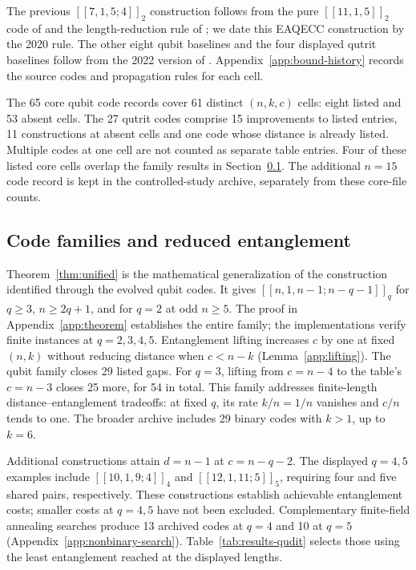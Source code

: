 \documentclass{article}
\begin{document}
The previous $[[7,1,5;4]]_2$ construction follows from the pure
$[[11,1,5]]_2$ code of \citet{CRSS1997} and the length-reduction rule of
\citet{GHW2020}; we date this EAQECC construction by the 2020 rule.
The other eight qubit baselines and the four displayed qutrit baselines
follow from the 2022 version of \citet{Luo2022}. Appendix~\ref{app:bound-history}
records the source codes and propagation rules for each cell.

The 65 core qubit code records cover 61 distinct $(n,k,c)$ cells: eight listed
and 53 absent cells. The 27 qutrit codes comprise 15 improvements
to listed entries, 11 constructions at absent cells and one code whose
distance is already listed. Multiple codes at one cell are not
counted as separate table entries. Four of these listed core cells overlap the
family results in Section~\ref{sec:family-results}. The additional
$n=15$ code record is kept in the controlled-study archive, separately from
these core-file counts.

\subsection{Code families and reduced entanglement}\label{sec:family-results}

Theorem~\ref{thm:unified} is the mathematical generalization of the
construction identified through the evolved qubit codes. It gives
$[[n,1,n-1;n-q-1]]_q$ for $q\ge3$, $n\ge2q+1$, and for $q=2$
at odd $n\ge5$. The proof in Appendix~\ref{app:theorem} establishes
the entire family; the implementations verify finite instances at
$q=2,3,4,5$. Entanglement lifting increases $c$ by one at fixed $(n,k)$
without reducing distance when $c<n-k$ (Lemma~\ref{app:lifting}).
The qubit family closes 29 listed gaps. For $q=3$, lifting from $c=n-4$
to the table's $c=n-3$ closes 25 more, for 54 in total.
This family addresses finite-length distance--entanglement tradeoffs:
at fixed $q$, its rate $k/n=1/n$ vanishes and $c/n$ tends to one.
The broader archive includes 29 binary codes with $k>1$, up to $k=6$.

Additional constructions attain $d=n-1$ at $c=n-q-2$.
The displayed $q=4,5$ examples include $[[10,1,9;4]]_4$ and
$[[12,1,11;5]]_5$, requiring four and five shared pairs, respectively.
These constructions establish achievable
entanglement costs; smaller costs at $q=4,5$ have not been excluded.
Complementary finite-field annealing searches produce 13 archived codes
at $q=4$ and 10 at $q=5$ (Appendix~\ref{app:nonbinary-search}).
Table~\ref{tab:results-qudit} selects those using the least entanglement
reached at the displayed lengths.
\end{document}
